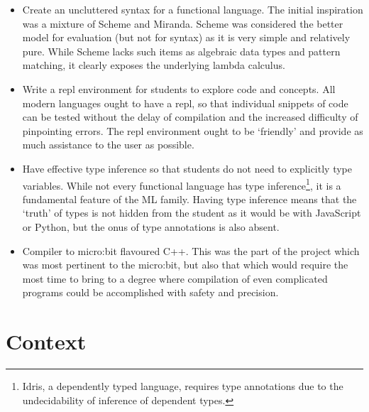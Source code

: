 \documentclass[12pt, a4paper]{report}
\begin{document}
\begin{itemize}
    \item Create an uncluttered syntax for a functional language. The initial inspiration was a
        mixture of Scheme and Miranda. Scheme was considered the better model for evaluation (but
        not for syntax) as it is very simple and relatively pure. While Scheme lacks such items as algebraic data types
        and pattern matching, it clearly exposes the underlying lambda calculus.
    \item Write a repl environment for students to explore code and concepts. All modern languages
        ought to have a repl, so that individual snippets of code can be tested without the delay of
        compilation and the increased difficulty of pinpointing errors. The repl environment ought
        to be `friendly' and provide as much assistance to the user as possible. 
    \item Have effective type inference so that students do not need to explicitly type variables.
        While not every functional language has type inference\footnote{Idris, a dependently typed language,
            requires type annotations due to the undecidability of inference of dependent types.},
        it is a fundamental feature of the ML family. Having type inference means that the `truth'
        of types is not hidden from the student as it would be with JavaScript or Python, but the
        onus of type annotations is also absent.
    \item Compiler to micro:bit flavoured C++. This was the part of the project which was most
        pertinent to the micro:bit, but also that which would require the most time to bring to a
        degree where compilation of even complicated programs could be accomplished with safety and
        precision. 
\end{itemize}

\chapter{Context}
\end{document}
